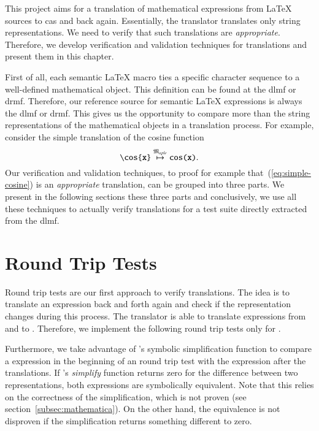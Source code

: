 This project aims for a translation of mathematical expressions from \LaTeX{} sources to \gls{cas} and back again. Essentially, the translator translates only string representations. We need to verify that such translations are \textit{appropriate}. Therefore, we develop verification and validation techniques for translations and present them in this chapter.

First of all, each semantic \LaTeX{} macro ties a specific character sequence to a well-defined mathematical object. This definition can be found at the \gls{dlmf} or \gls{drmf}. Therefore, our reference source for semantic \LaTeX{} expressions is always the \gls{dlmf} or \gls{drmf}. This gives us the opportunity to compare more than the string representations of the mathematical objects in a translation process. For example, consider the simple translation of the cosine function
\begin{equation}\label{eq:simple-cosine}
\verb|\cos{x}| \overset{\langMaple}{\mapsto} \texttt{cos(x)}.
\end{equation}
Our verification and validation techniques, to proof for example that~(\ref{eq:simple-cosine}) is an \textit{appropriate} translation, can be grouped into three parts. We present in the following sections these three parts and conclusively, we use all these techniques to actually verify translations for a test suite directly extracted from the \gls{dlmf}.

\section{Round Trip Tests}\label{sec:round-trip}
Round trip tests are our first approach to verify translations. The idea is to translate an expression back and forth again and check if the representation changes during this process. The translator is able to translate expressions from and to \Maple. Therefore, we implement the following round trip tests only for \Maple.

Furthermore, we take advantage of \Maple's symbolic simplification function to compare a \Maple{} expression in the beginning of an round trip test with the \Maple{} expression after the translations. If \Maple's \textit{simplify} function returns zero for the difference between two representations, both expressions are symbolically equivalent. Note that this relies on the correctness of the simplification, which is not proven (see section~\ref{subsec:mathematica}). On the other hand, the equivalence is not disproven if the simplification returns something different to zero.


